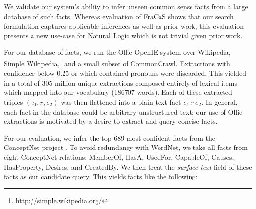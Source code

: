 %
%

\begin{table}
\begin{center}
  \caption{
    Accuracy inferring common-sense facts on a balanced test set.
    Lookup queries the lemmatized lower-case fact directly in the
      300M fact database.
    NaturalLI Only disallows such lookups, and infers every query from
      only unseen facts.
    NaturalLI + Lookup takes the union of the two systems.
    \label{tab:conceptnet}
  }
\end{center}
\end{table}

We validate our system's ability to infer unseen common sense facts
  from a large database of such facts.
Whereas evaluation of FraCaS shows that our search formulation captures
  applicable inferences as well as prior work, this evaluation presents
  a new use-case for Natural Logic which is not trivial
  given prior work.

For our database of facts, we run the Ollie OpenIE system
  \cite{key:2012mausam-ollie} over Wikipedia, Simple Wikipedia,\footnote{
    \url{http://simple.wikipedia.org/}
  }
  and a small subset of CommonCrawl.
Extractions with confidence below 0.25 or which contained
  pronouns were discarded.
This yielded in a total of 305 million unique extractions composed
  entirely of lexical items which mapped into our vocabulary
  (\num{186707} words).
Each of these extracted triples $(e_1,r,e_2)$ was then flattened into
  a plain-text fact $e_1~r~e_2$.
In general, each fact in the database could be arbitrary unstructured
  text; our use of Ollie extractions is motivated by a desire to
  extract and query concise facts.

For our evaluation, we infer the top 689 most confident facts from
  the ConceptNet project \cite{key:2011tandon-conceptnet}.
To avoid redundancy with WordNet, we take all facts from eight
  ConceptNet relations: 
    MemberOf,
    HasA,
    UsedFor,
    CapableOf,
    Causes,
    HasProperty,
    Desires, and 
    CreatedBy.
We then treat the \textit{surface text} field of these facts as our
  candidate query.
This yields facts like the following:

